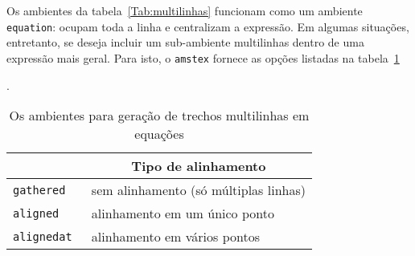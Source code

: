 Os ambientes da tabela~\ref{Tab:multilinhas} funcionam como um
ambiente \texttt{equation}: ocupam toda a linha e centralizam a
expressão.  Em algumas situações, entretanto, se deseja incluir um
sub-ambiente multilinhas dentro de uma expressão mais geral. Para
isto, o \texttt{amstex} fornece as opções listadas na
tabela~\ref{Tab:submultilinhas}\addtocounter{footnote}{-1}\footnotemark.


\begin{table}[htbp]
\begin{center}
\begin{tabular}{|>{\tt}l|l|} \hline
\multicolumn{1}{|c|}{PACOTE} &
\multicolumn{1}{c|}{Tipo de alinhamento}
\\ \hline
gathered & sem alinhamento (só múltiplas linhas) \\
aligned & alinhamento em um único ponto \\
alignedat & alinhamento em vários pontos
\\ \hline
\end{tabular}
\end{center}
\caption{Os ambientes para geração de trechos multilinhas em equações}
\label{Tab:submultilinhas}
\end{table}

